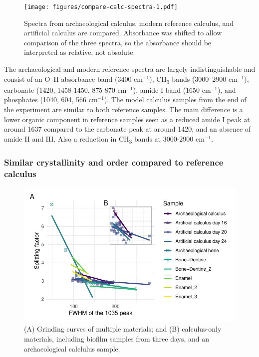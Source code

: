 \documentclass[
]{article}
\begin{document}
\begin{figure}

{\centering \texttt{[image: figures/compare-calc-spectra-1.pdf]}

}

\caption{Spectra from archaeological calculus, modern reference
calculus, and artificial calculus are compared. Absorbance was shifted
to allow comparison of the three spectra, so the absorbance should be
interpreted as relative, not absolute.}

\end{figure}

The archaeological and modern reference spectra are largely
indistinguishable and consist of an O--H absorbance band (3400
cm\(^{-1}\)), CH\textsubscript{3} bands (3000--2900 cm\(^{-1}\)),
carbonate (1420, 1458-1450, 875-870 cm\(^{-1}\)), amide I band (1650
cm\(^{-1}\)), and phosphates (1040, 604, 566 cm\(^{-1}\)). The model
calculus samples from the end of the experiment are similar to both
reference samples. The main difference is a lower organic component in
reference samples seen as a reduced amide I peak at around 1637 compared
to the carbonate peak at around 1420, and an absence of amide II and
III. Also a reduction in CH\textsubscript{3} bands at 3000-2900
cm\(^{-1}\).

\hypertarget{similar-crystallinity-and-order-compared-to-reference-calculus}{%
\subsubsection{Similar crystallinity and order compared to reference
calculus}\label{similar-crystallinity-and-order-compared-to-reference-calculus}}

\begin{figure}

{\centering \includegraphics{figures/fig-grind-curve-1.pdf}

}

\caption{\label{fig-grind-curve}(A) Grinding curves of multiple
materials; and (B) calculus-only materials, including biofilm samples
from three days, and an archaeological calclulus sample.}

\end{figure}
\end{document}
